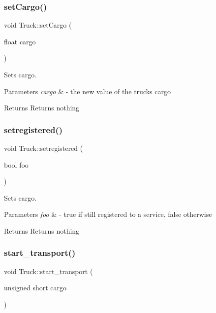 \subsubsection{\texorpdfstring{set\+Cargo()}{setCargo()}}
{\footnotesize\ttfamily void Truck\+::set\+Cargo (\begin{DoxyParamCaption}\item[{float}]{cargo }\end{DoxyParamCaption})}



Sets cargo. 


\begin{DoxyParams}{Parameters}
{\em cargo} & -\/ the new value of the truck\textquotesingle{}s cargo \\
\hline
\end{DoxyParams}
\begin{DoxyReturn}{Returns}
Returns nothing 
\end{DoxyReturn}
\mbox{\label{class_truck_a9268e17e1a967d1702b28c6940403aa4}} 
\subsubsection{\texorpdfstring{setregistered()}{setregistered()}}
{\footnotesize\ttfamily void Truck\+::setregistered (\begin{DoxyParamCaption}\item[{bool}]{foo }\end{DoxyParamCaption})}



Sets cargo. 


\begin{DoxyParams}{Parameters}
{\em foo} & -\/ true if still registered to a service, false otherwise \\
\hline
\end{DoxyParams}
\begin{DoxyReturn}{Returns}
Returns nothing 
\end{DoxyReturn}
\mbox{\label{class_truck_aca68ecb83bcdc73de6bd381dccb70e4d}} 
\subsubsection{\texorpdfstring{start\+\_\+transport()}{start\_transport()}}
{\footnotesize\ttfamily void Truck\+::start\+\_\+transport (\begin{DoxyParamCaption}\item[{unsigned short}]{cargo }\end{DoxyParamCaption})}



